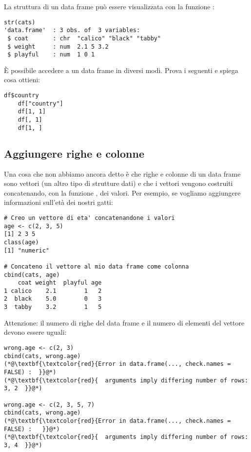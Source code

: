 \noindent La struttura di un data frame pu\`o essere visualizzata con la funzione :

\begin{lstlisting}[style=Rstyle]	
str(cats)
'data.frame'  :	3 obs. of  3 variables:
 $ coat       : chr  "calico" "black" "tabby"
 $ weight     : num  2.1 5 3.2
 $ playful    : num  1 0 1
\end{lstlisting}

\vspace{0.5cm} 

\begin{exercise}\label{ex3.1}

\noindent \`E possibile accedere a un data frame in diversi modi. Prova i seguenti e spiega cosa ottieni:

\begin{lstlisting}[style=Rstyle]	
    df$country
    df["country"]
    df[1, 1]
    df[, 1]
    df[1, ]
\end{lstlisting}

\end{exercise}


\subsection{Aggiungere righe e colonne}

Una cosa che non abbiamo ancora detto \`e che righe e colonne di un data frame sono vettori (un altro tipo di strutture dati) e che i vettori vengono costruiti concatenando, con la funzione , dei valori. Per esempio, se vogliamo aggiungere informazioni sull'et\`a dei nostri gatti:

\begin{lstlisting}[style=Rstyle]	
# Creo un vettore di eta' concatenandone i valori
age <- c(2, 3, 5)
[1] 2 3 5
class(age)
[1] "numeric"

# Concateno il vettore al mio data frame come colonna
cbind(cats, age)
    coat weight  playful age
1 calico    2.1        1   2
2  black    5.0        0   3
3  tabby    3.2        1   5
\end{lstlisting}
%
Attenzione: il numero di righe del data frame e il numero di elementi del vettore devono essere uguali:

\begin{lstlisting}[style=Rstyle]	
wrong.age <- c(2, 3)
cbind(cats, wrong.age)
(*@\textbf{\textcolor{red}{Error in data.frame(..., check.names = FALSE) :  }}@*)
(*@\textbf{\textcolor{red}{  arguments imply differing number of rows: 3, 2  }}@*)
  
wrong.age <- c(2, 3, 5, 7)
cbind(cats, wrong.age)
(*@\textbf{\textcolor{red}{Error in data.frame(..., check.names = FALSE) :   }}@*)
(*@\textbf{\textcolor{red}{  arguments imply differing number of rows: 3, 4  }}@*)
\end{lstlisting}

